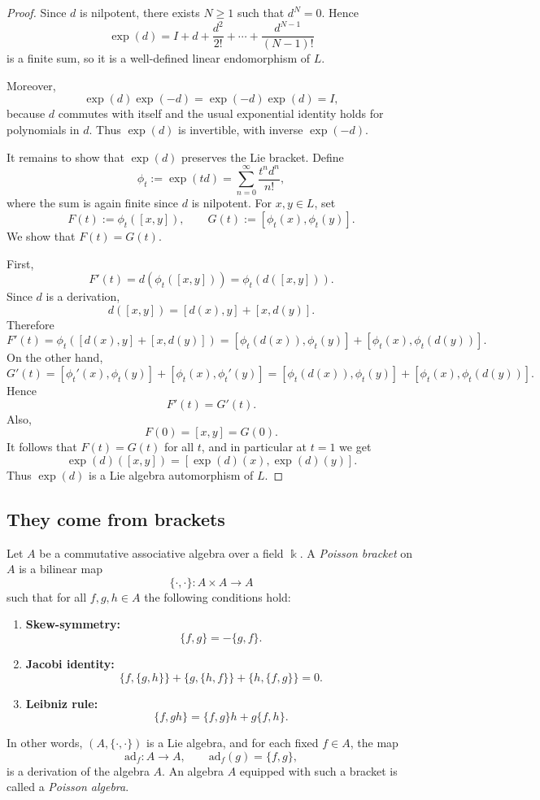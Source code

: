 \begin{proof}
    Since $d$ is nilpotent, there exists $N\ge 1$ such that $d^N=0$. Hence
    \[
        \exp(d)=I+d+\frac{d^2}{2!}+\cdots+\frac{d^{N-1}}{(N-1)!}
    \]
    is a finite sum, so it is a well-defined linear endomorphism of $L$.

    Moreover,
    \[
        \exp(d)\exp(-d)=\exp(-d)\exp(d)=I,
    \]
    because $d$ commutes with itself and the usual exponential identity holds for polynomials in $d$.
    Thus $\exp(d)$ is invertible, with inverse $\exp(-d)$.

    It remains to show that $\exp(d)$ preserves the Lie bracket. Define
    \[
        \phi_t:=\exp(td)=\sum_{n=0}^{\infty}\frac{t^n d^n}{n!},
    \]
    where the sum is again finite since $d$ is nilpotent. For $x,y\in L$, set
    \[
        F(t):=\phi_t([x,y]), \qquad G(t):=[\phi_t(x),\phi_t(y)].
    \]
    We show that $F(t)=G(t)$.

    First,
    \[
        F'(t)=d(\phi_t([x,y]))=\phi_t(d([x,y])).
    \]
    Since $d$ is a derivation,
    \[
        d([x,y])=[d(x),y]+[x,d(y)].
    \]
    Therefore
    \[
        F'(t)=\phi_t([d(x),y]+[x,d(y)])
        =[\phi_t(d(x)),\phi_t(y)]+[\phi_t(x),\phi_t(d(y))].
    \]
    On the other hand,
    \[
        G'(t)=[\phi_t'(x),\phi_t(y)]+[\phi_t(x),\phi_t'(y)]
        =[\phi_t(d(x)),\phi_t(y)]+[\phi_t(x),\phi_t(d(y))].
    \]
    Hence
    \[
        F'(t)=G'(t).
    \]
    Also,
    \[
        F(0)=[x,y]=G(0).
    \]
    It follows that $F(t)=G(t)$ for all $t$, and in particular at $t=1$ we get
    \[
        \exp(d)([x,y])=[\exp(d)(x),\exp(d)(y)].
    \]
    Thus $\exp(d)$ is a Lie algebra automorphism of $L$.
\end{proof}

\subsection{They come from brackets}

\begin{definition}
    Let $A$ be a commutative associative algebra over a field $\Bbbk$.
    A \emph{Poisson bracket} on $A$ is a bilinear map
    \[
        \{\cdot,\cdot\}:A\times A\to A
    \]
    such that for all $f,g,h\in A$ the following conditions hold:
    \begin{enumerate}
        \item \textbf{Skew-symmetry:}
              \[
                  \{f,g\}=-\{g,f\}.
              \]
        \item \textbf{Jacobi identity:}
              \[
                  \{f,\{g,h\}\}+\{g,\{h,f\}\}+\{h,\{f,g\}\}=0.
              \]
        \item \textbf{Leibniz rule:}
              \[
                  \{f,gh\}=\{f,g\}h+g\{f,h\}.
              \]
    \end{enumerate}
    In other words, $(A,\{\cdot,\cdot\})$ is a Lie algebra, and for each fixed
    $f\in A$, the map
    \[
        \mathrm{ad}_f:A\to A,\qquad \mathrm{ad}_f(g)=\{f,g\},
    \]
    is a derivation of the algebra $A$.
    An algebra $A$ equipped with such a bracket is called a \emph{Poisson algebra}.
\end{definition}

